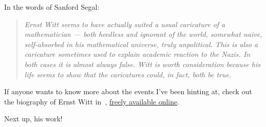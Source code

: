 In the words of Sanford Segal:
\begin{quote}
  \textsl{Ernst Witt seems to have actually suited a usual caricature of a mathematician --- both heedless and ignorant of the world, somewhat naive, self-absorbed in his mathematical universe, truly unpolitical. This is also a caricature sometimes used to explain academic reaction to the Nazis. In both cases it is almost always false. Witt is worth consideration because his life seems to show that the caricatures could, in fact, both be true.}
\end{quote}

If anyone wants to know more about the events I've been hinting at, check out the biography of Ernst Witt in~\cite{quadratic-forms}, \href{http://www.maths.ed.ac.uk/~aar/books/dublin.pdf}{freely available online}.

Next up, his work!
